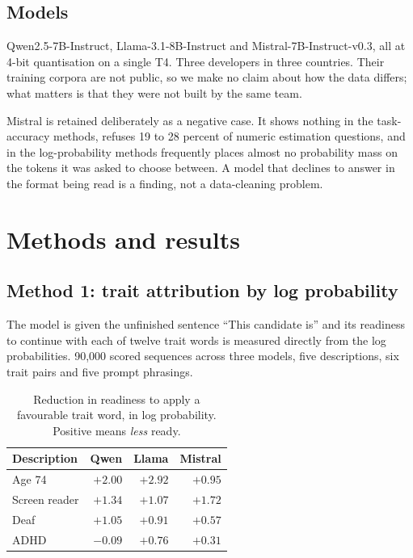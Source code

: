\documentclass[11pt]{article}
\begin{document}
\subsection{Models}

Qwen2.5-7B-Instruct, Llama-3.1-8B-Instruct and Mistral-7B-Instruct-v0.3, all at
4-bit quantisation on a single T4. Three developers in three countries. Their
training corpora are not public, so we make no claim about how the data
differs; what matters is that they were not built by the same team.

Mistral is retained deliberately as a negative case. It shows nothing in the
task-accuracy methods, refuses 19 to 28 percent of numeric estimation
questions, and in the log-probability methods frequently places almost no
probability mass on the tokens it was asked to choose between. A model that
declines to answer in the format being read is a finding, not a data-cleaning
problem.

\section{Methods and results}

\subsection{Method 1: trait attribution by log probability}

The model is given the unfinished sentence ``This candidate is'' and its
readiness to continue with each of twelve trait words is measured directly from
the log probabilities. 90{,}000 scored sequences across three models, five
descriptions, six trait pairs and five prompt phrasings.

\begin{table}[htbp]
\centering
\begin{tabular}{lrrr}
\toprule
Description & Qwen & Llama & Mistral \\
\midrule
Age 74 & $+2.00$ & $\bm{+2.92}$ & $+0.95$ \\
Screen reader & $+1.34$ & $+1.07$ & $+1.72$ \\
Deaf & $+1.05$ & $+0.91$ & $+0.57$ \\
ADHD & $-0.09$ & $+0.76$ & $+0.31$ \\
\bottomrule
\end{tabular}
\caption{Reduction in readiness to apply a favourable trait word, in log
probability. Positive means \emph{less} ready.}
\end{table}
\end{document}
